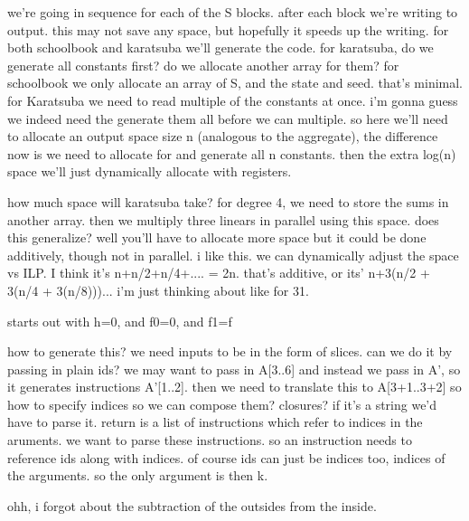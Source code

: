 we're going in sequence for each of the S blocks. after each block we're writing to output. this may not save any space, but hopefully it speeds up the writing.
for both schoolbook and karatsuba we'll generate the code. for karatsuba, do we generate all constants first? do we allocate another array for them? 
for schoolbook we only allocate an array of S, and the state and seed. that's minimal.
for Karatsuba we need to read multiple of the constants at once. i'm gonna guess we indeed need the generate them all before we can multiple. so here we'll need to allocate an output space size n (analogous to the aggregate), the difference now is we need to allocate for and generate all n constants. then the extra log(n) space we'll just dynamically allocate with registers. 


how much space will karatsuba take?
for degree 4, we need to store the sums in another array. then we multiply three linears in parallel using this space. 
does this generalize? well you'll have to allocate more space but it could be done additively, though not in parallel. i like this. we can dynamically adjust the space vs ILP. I think it's n+n/2+n/4+.... = 2n. that's additive, or its' n+3(n/2 + 3(n/4 + 3(n/8)))... i'm just thinking about like for 31.

starts out with h=0, and f0=0, and f1=f


how to generate this?
we need inputs to be in the form of slices. 
can we do it by passing in plain ids? we may want to pass in A[3..6] and instead we pass in A', so it generates instructions A'[1..2]. then we need to translate this to A[3+1..3+2]
so how to specify indices so we can compose them? closures? if it's a string we'd have to parse it. return is a list of instructions which refer to indices in the aruments. we want to parse these instructions. so an instruction needs to reference ids along with indices. 
of course ids can just be indices too, indices of the arguments. so the only argument is then k. 

ohh, i forgot about the subtraction of the outsides from the inside. 

